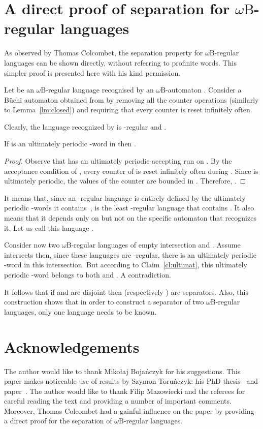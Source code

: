 \documentclass{LMCS}
\newcommand{\wB}{\ensuremath{\omega \mathrm{B}}\xspace}
\begin{document}
\section{A direct proof of separation for \wB-regular languages}\label{s:direct}

As observed by Thomas Colcombet, the separation property for \wB-regular languages can be shown directly, without referring to profinite words. This simpler proof is presented here with his kind permission.

Let  be an \wB-regular language recognised by an \wB-automaton . Consider a B\"uchi automaton  obtained from  by removing all the counter operations (similarly to Lemma~\ref{lm:closed}) and requiring that every counter is reset infinitely often.

Clearly, the language recognized by  is -regular and .

\begin{claim}\label{cl:ultimat}
If  is an ultimately periodic -word in  then .
\end{claim}

\begin{proof}
Observe that  has an ultimately periodic accepting run  on . By the acceptance condition of , every counter  of  is reset infinitely often during . Since  is ultimately periodic, the values of the counter  are bounded in . Therefore, .
\end{proof}

It means that, since an -regular language is entirely defined by the ultimately periodic -words it contains~\cite{buchi_decision},  is the least -regular language that contains . It also means that it depends only on  but not on the specific automaton  that recognizes it. Let us call this language .

Consider now two \wB-regular languages of empty intersection  and . Assume  intersects  then, since these languages are -regular, there is an ultimately periodic -word in this intersection. But according to Claim~\ref{cl:ultimat}, this ultimately periodic -word belongs to both  and . A contradiction.

It follows that if  and  are disjoint then  (respectively ) are separators. Also, this construction shows that in order to construct a separator of two \wB-regular languages, only one language needs to be known.



\section{Acknowledgements}\label{s:ack}

The author would like to thank Miko{\l}aj Boja{\'n}czyk for his suggestions. This paper makes noticeable use of results by Szymon Toru{\'n}czyk: his PhD thesis~\cite{torunczyk_phd} and paper~\cite{torunczyk_limitedness}. The author would like to thank Filip Mazowiecki and the referees for careful reading the text and providing a number of important comments. Moreover, Thomas Colcombet had a gainful influence on the paper by providing a direct proof for the separation of \wB-regular languages.





\end{document}
